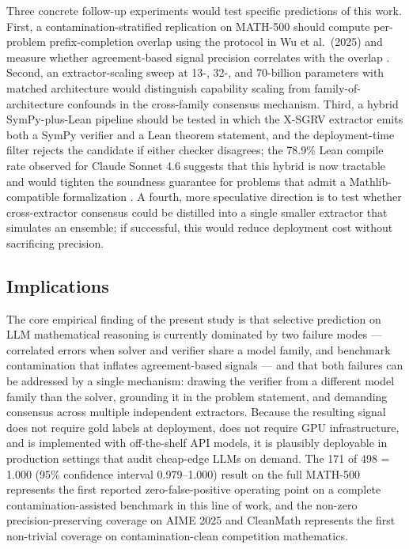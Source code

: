 \documentclass[11pt]{article}
\begin{document}
Three concrete follow-up experiments would test specific predictions of this work. First, a contamination-stratified replication on MATH-500 should compute per-problem prefix-completion overlap using the protocol in Wu et al.\ (2025) and measure whether agreement-based signal precision correlates with the overlap \citep{wu2025contam}. Second, an extractor-scaling sweep at 13-, 32-, and 70-billion parameters with matched architecture would distinguish capability scaling from family-of-architecture confounds in the cross-family consensus mechanism. Third, a hybrid SymPy-plus-Lean pipeline should be tested in which the X-SGRV extractor emits both a SymPy verifier and a Lean theorem statement, and the deployment-time filter rejects the candidate if either checker disagrees; the 78.9\% Lean compile rate observed for Claude Sonnet 4.6 suggests that this hybrid is now tractable and would tighten the soundness guarantee for problems that admit a Mathlib-compatible formalization \citep{hermes2025}. A fourth, more speculative direction is to test whether cross-extractor consensus could be distilled into a single smaller extractor that simulates an ensemble; if successful, this would reduce deployment cost without sacrificing precision.

\subsection{Implications}

The core empirical finding of the present study is that selective prediction on LLM mathematical reasoning is currently dominated by two failure modes --- correlated errors when solver and verifier share a model family, and benchmark contamination that inflates agreement-based signals --- and that both failures can be addressed by a single mechanism: drawing the verifier from a different model family than the solver, grounding it in the problem statement, and demanding consensus across multiple independent extractors. Because the resulting signal does not require gold labels at deployment, does not require GPU infrastructure, and is implemented with off-the-shelf API models, it is plausibly deployable in production settings that audit cheap-edge LLMs on demand. The 171 of 498 = 1.000 (95\% confidence interval 0.979--1.000) result on the full MATH-500 represents the first reported zero-false-positive operating point on a complete contamination-assisted benchmark in this line of work, and the non-zero precision-preserving coverage on AIME 2025 and CleanMath represents the first non-trivial coverage on contamination-clean competition mathematics.
\end{document}
